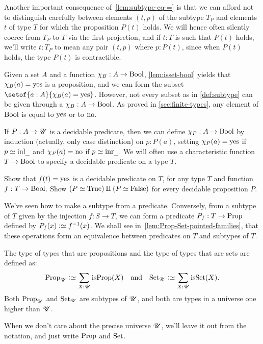 \begin{remark}\label{rem:subtype-convention}
  Another important consequence of~\cref{lem:subtype-eq-=}
  is that we can afford not to distinguish carefully
  between elements $(t,p)$ of the subtype $T_P$
  and elements $t$ of type $T$ for which the proposition $P(t)$ holds.
  We will hence often silently coerce from $T_P$ to $T$ via the first projection,
  and if $t:T$ is such that $P(t)$ holds, we'll write $t:T_P$
  to mean any pair $(t,p)$ where $p:P(t)$,
  since when $P(t)$ holds, the type $P(t)$ is contractible.
\end{remark}
Given a set $A$ and a function $\chi_B: A\to\mathrm{Bool}$,
\cref{lem:isset-bool} yields that $\chi_B(a) = \mathrm{yes}$ is a
proposition, and we can form
the subset $\setof{a:A}{\chi_B(a) = \yes}$. However,
not every subset as in \cref{def:subtype} can be given
through a $\chi_B: A\to\mathrm{Bool}$. As proved in \cref{sec:finite-types},
any element of $\mathrm{Bool}$ is equal to $\mathrm{yes}$ or to $\mathrm{no}$.

If $P: A\to{\mathscr{U}}$ is a decidable predicate, then
we can define $\chi_P: A\to\mathrm{Bool}$ by induction (actually,
only case distinction) on $p:P(a)$, setting $\chi_P(a)=\mathrm{yes}$
if $p\jdeq\inl{\_}$ and $\chi_P(a)=\mathrm{no}$ if $p\jdeq\inr{\_}$.
We will often use a characteristic function $T\to\mathrm{Bool}$ to
specify a decidable predicate on a type $T$.

\begin{xca}\label{xca:decidability}
Show that $f(t)=\mathrm{yes}$ is a decidable predicate on $T$,
for any type $T$ and function $f:T\to\mathrm{Bool}$.
Show $(P\simeq\mathrm{True})\amalg(P\simeq\mathrm{False})$ for every decidable
proposition $P$.
\end{xca}
We've seen how to make a subtype from a predicate.
Conversely, from a subtype of $T$ given by the injection
$f : S \to T$,
we can form a predicate $P_f : T \to \mathrm{Prop}$ defined by $P_f(x) \defeq \inv f(x)$.
We shall see in~\cref{lem:Prop-Set-pointed-families},
that these operations form an equivalence
between predicates on $T$ and subtypes of $T$.

\begin{definition}\label{def:Prop-Set}
The type of types that are propositions and the
type of types that are sets are defined as:
\[\Prop_\UU\defeq \sum_{X:\UU}\isprop(X)\quad
\text{and}\quad\Set_\UU\defeq \sum_{X:\UU}\isset(X).\]
Both $\mathrm{Prop}_{\mathscr{U}}$ and $\mathrm{Set}_{\mathscr{U}}$ are subtypes of ${\mathscr{U}}$, and
both are types in a universe one higher than ${\mathscr{U}}$.
\end{definition}
When we don't care about the precise universe ${\mathscr{U}}$,
we'll leave it out from the notation,
and just write $\mathrm{Prop}$ and $\mathrm{Set}$.

